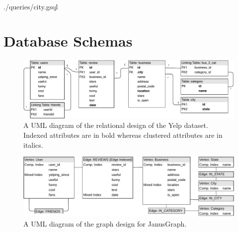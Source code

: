 

{./queries/city.gsql}


\newpage
\onecolumn
\section{Database Schemas}
\label{app:schema}

\begin{figure}[htp]
    \centering
    \includegraphics[width=16cm]{img/schema/yelpRelational.pdf}
    \caption{A UML diagram of the relational design of the Yelp dataset. Indexed attributes are in bold whereas clustered attributes are in italics.}
    \label{fig:relational-design}
\end{figure}

\begin{figure}[htp]
    \centering
    \includegraphics[width=16cm]{img/schema/yelpJanus.pdf}
    \caption{A UML diagram of the graph design for JanusGraph.}
    \label{fig:janusgraph-design}
\end{figure}

